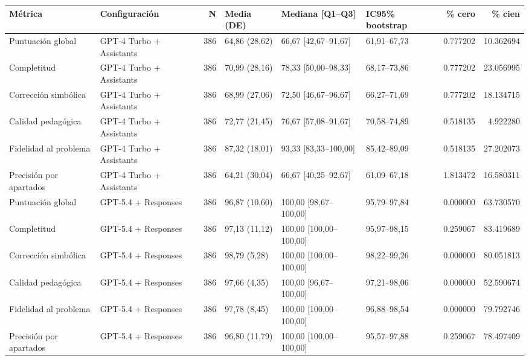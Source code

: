 \begin{tabular}{llrlllrr}
\toprule
Métrica & Configuración & N & Media (DE) & Mediana [Q1–Q3] & IC95\% bootstrap & \% cero & \% cien \\
\midrule
Puntuación global & GPT-4 Turbo + Assistants & 386 & 64,86 (28,62) & 66,67 [42,67–91,67] & 61,91–67,73 & 0.777202 & 10.362694 \\
Completitud & GPT-4 Turbo + Assistants & 386 & 70,99 (28,16) & 78,33 [50,00–98,33] & 68,17–73,86 & 0.777202 & 23.056995 \\
Corrección simbólica & GPT-4 Turbo + Assistants & 386 & 68,99 (27,06) & 72,50 [46,67–96,67] & 66,27–71,69 & 0.777202 & 18.134715 \\
Calidad pedagógica & GPT-4 Turbo + Assistants & 386 & 72,77 (21,45) & 76,67 [57,08–91,67] & 70,58–74,89 & 0.518135 & 4.922280 \\
Fidelidad al problema & GPT-4 Turbo + Assistants & 386 & 87,32 (18,01) & 93,33 [83,33–100,00] & 85,42–89,09 & 0.518135 & 27.202073 \\
Precisión por apartados & GPT-4 Turbo + Assistants & 386 & 64,21 (30,04) & 66,67 [40,25–92,67] & 61,09–67,18 & 1.813472 & 16.580311 \\
Puntuación global & GPT-5.4 + Responses & 386 & 96,87 (10,60) & 100,00 [98,67–100,00] & 95,79–97,84 & 0.000000 & 63.730570 \\
Completitud & GPT-5.4 + Responses & 386 & 97,13 (11,12) & 100,00 [100,00–100,00] & 95,97–98,15 & 0.259067 & 83.419689 \\
Corrección simbólica & GPT-5.4 + Responses & 386 & 98,79 (5,28) & 100,00 [100,00–100,00] & 98,22–99,26 & 0.000000 & 80.051813 \\
Calidad pedagógica & GPT-5.4 + Responses & 386 & 97,66 (4,35) & 100,00 [96,67–100,00] & 97,21–98,06 & 0.000000 & 52.590674 \\
Fidelidad al problema & GPT-5.4 + Responses & 386 & 97,78 (8,45) & 100,00 [100,00–100,00] & 96,88–98,54 & 0.000000 & 79.792746 \\
Precisión por apartados & GPT-5.4 + Responses & 386 & 96,80 (11,79) & 100,00 [100,00–100,00] & 95,57–97,88 & 0.259067 & 78.497409 \\
\bottomrule
\end{tabular}
